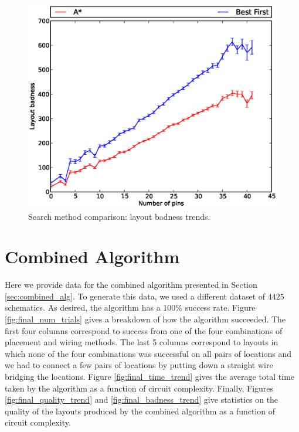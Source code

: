 \begin{figure}[H]
\begin{center}
\includegraphics[width=\textwidth]{Images/search_badness_trend_comparison.eps}
\caption{Search method comparison: layout badness trends.}
\label{fig:search_badness_trend}
\end{center}
\end{figure}

\section{Combined Algorithm}
\label{sec:combined_algorithm}

Here we provide data for the combined algorithm presented in Section
\ref{sec:combined_alg}. To generate this data, we used a different dataset of
$4425$ schematics. As desired, the algorithm has a $100\%$ success rate.
Figure \ref{fig:final_num_trials} gives a breakdown of how the algorithm
succeeded. The first four columns correspond to success from one of the four
combinations of placement and wiring methods. The last 5 columns correspond to
layouts in which none of the four combinations was successful on all pairs of
locations and we had to connect a few pairs of locations by putting down a
straight wire bridging the locations. Figure
\ref{fig:final_time_trend} gives the average total time taken by the algorithm
as a function of circuit complexity. Finally, Figures
\ref{fig:final_quality_trend} and \ref{fig:final_badness_trend}
give statistics on the quality of the layouts produced by the combined algorithm
as a function of circuit complexity.


